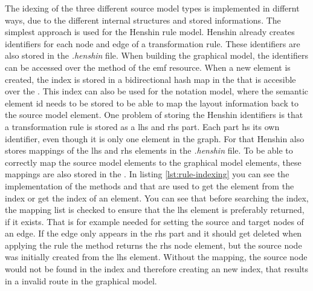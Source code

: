   The idexing of the three different source model types is implemented in differnt ways, due to the different internal structures and stored informations. The simplest approach is used for the Henshin rule model. Henshin already creates identifiers for each node and edge of a transformation rule. These identifiers are also stored in the \textit{.henshin} file. When building the graphical model, the identifiers can be accessed over the method  of the \ac{emf} resource. When a new element is created, the index is stored in a bidirectional hash map in the  that is accesible over the . This index can also be used for the notation model, where the semantic element id needs to be stored to be able to map the layout information back to the source model element. One problem of storing the Henshin identifiers is that a transformation rule is stored as a \ac{lhs} and \ac{rhs} part. Each part hs its own identifier, even though it is only one element in the graph. For that Henshin also stores mappings of the \ac{lhs} and \ac{rhs} elements in the \textit{.henshin} file. To be able to correctly map the source model elements to the graphical model elements, these mappings are also stored in the . In listing \ref{lst:rule-indexing} you can see the implementation of the methods  and  that are used to get the element from the index or get the index of an element. You can see that before searching the index, the mapping list is checked to ensure that the \ac{lhs} element is preferably returned, if it exists. That is for example needed for setting the source and target nodes of an edge. If the edge only appears in the \ac{rhs} part and it should get deleted when applying the rule the  method returns the \ac{rhs} node element, but the source node was initially created from the \ac{lhs} element. Without the mapping, the source node would not be found in the index and therefore creating an new index, that results in a invalid route in the graphical model.

  



